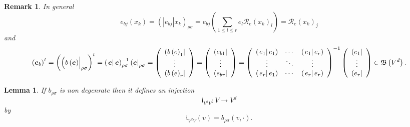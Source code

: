 \documentclass[aps,preprint]{revtex4}
\newtheorem{lemma}[theorem]{Lemma}
\newtheorem{remark}[theorem]{Remark}
\begin{document}
\begin{remark}
In general 
\begin{equation}
e_{bj}\left( x_{k}\right) =\left( \left\vert e_{bj}\right\vert x_{k}\right)
_{\rho \sigma }=e_{bj}\left( \sum_{1\leq l\leq r}e_{l}\mathcal{R}_{e}\left(
x_{k}\right) _{l}\right) =\mathcal{R}_{e}\left( x_{k}\right) _{j}
\end{equation}%
and 
\begin{equation*}
\left( \boldsymbol{e}_{b}\right) ^{t}=\left( \overset{}{\left( \overset{}{%
b\left( \boldsymbol{e}\right) }\right\vert _{\rho \sigma }}\right)
^{t}=\left( \left. \boldsymbol{e}\right\vert \boldsymbol{e}\right) _{\rho
\sigma }^{-1}\left( \boldsymbol{e}\right\vert _{\rho \sigma }=\left( 
\begin{array}{c}
\left( b\left( e\right) _{1}\right\vert \\ 
\vdots \\ 
\left( b\left( e\right) _{r}\right\vert%
\end{array}%
\right) =\left( 
\begin{array}{c}
\left( e_{b1}\right\vert \\ 
\vdots \\ 
\left( e_{br}\right\vert%
\end{array}%
\right) =\left( 
\begin{array}{ccc}
\left( \left. e_{1}\right\vert e_{1}\right) & \cdots & \left( \left.
e_{1}\right\vert e_{r}\right) \\ 
\vdots & \ddots & \vdots \\ 
\left( \left. e_{r}\right\vert e_{1}\right) & \cdots & \left( \left.
e_{r}\right\vert e_{r}\right)%
\end{array}%
\right) ^{-1}\left( 
\begin{array}{c}
\left( e_{1}\right\vert \\ 
\vdots \\ 
\left( e_{r}\right\vert%
\end{array}%
\right) \in \mathfrak{B}\left( V^{d}\right) .
\end{equation*}
\end{remark}

\begin{lemma}
If $b_{\rho \sigma }$ is non degenrate then it defines an injection%
\begin{equation}
\mathfrak{i}_{V^{d}V}:V\rightarrow V^{d}
\end{equation}%
by 
\begin{equation}
\mathfrak{i}_{V^{d}V}\left( v\right) =b_{\rho \sigma }\left( v,\cdot \right)
.
\end{equation}
\end{lemma}
\end{document}
